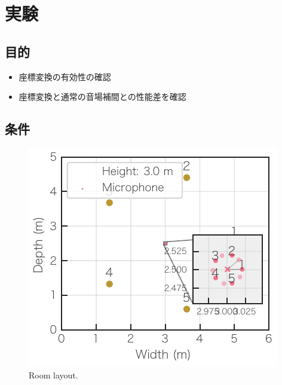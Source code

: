 \documentclass[twocolumn,9pt,dvipdfmx]{article}
\begin{document}
\section{実験}
\subsection*{目的}
\begin{itemize}
  \item 座標変換の有効性の確認
  \item 座標変換と通常の音場補間との性能差を確認
\end{itemize}

\subsection*{条件}
\begin{figure}[t]
  \centering
  \includegraphics{figures/room_layout.pdf}
  \caption{Room layout.}%
  \label{fig:layout}
\end{figure}
\end{document}
